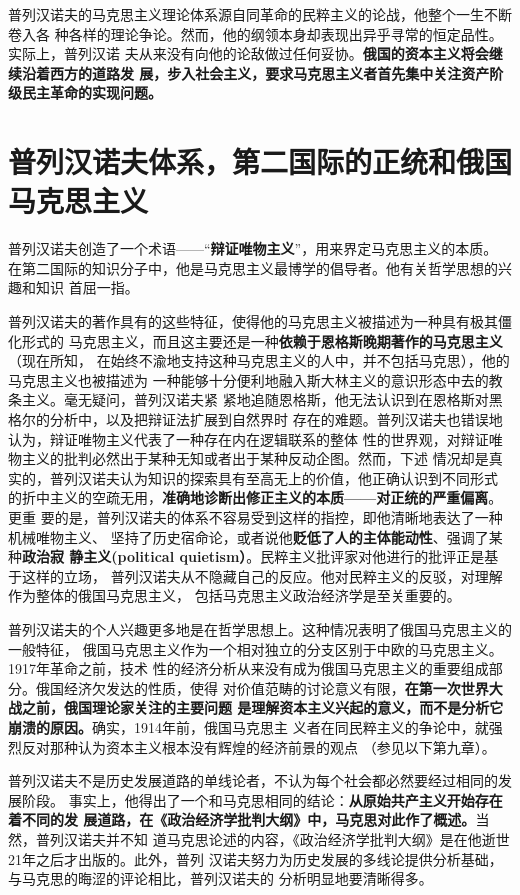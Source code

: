 普列汉诺夫的马克思主义理论体系源自同革命的民粹主义的论战，他整个一生不断卷入各
种各样的理论争论。然而，他的纲领本身却表现出异乎寻常的恒定品性。实际上，普列汉诺
夫从来没有向他的论敌做过任何妥协。\textbf{俄国的资本主义将会继续沿着西方的道路发
  展，步入社会主义，要求马克思主义者首先集中关注资产阶级民主革命的实现问题。}

\section{普列汉诺夫体系，第二国际的正统和俄国马克思主义}
普列汉诺夫创造了一个术语——“\textbf{辩证唯物主义}”，用来界定马克思主义的本质。
在第二国际的知识分子中，他是马克思主义最博学的倡导者。他有关哲学思想的兴趣和知识
首屈一指。

普列汉诺夫的著作具有的这些特征，使得他的马克思主义被描述为一种具有极其僵化形式的
马克思主义，而且这主要还是一种\textbf{依赖于恩格斯晚期著作的马克思主义}（现在所知，
在始终不渝地支持这种马克思主义的人中，并不包括马克思），他的马克思主义也被描述为
一种能够十分便利地融入斯大林主义的意识形态中去的教条主义。毫无疑问，普列汉诺夫紧
紧地追随恩格斯，他无法认识到在恩格斯对黑格尔的分析中，以及把辩证法扩展到自然界时
存在的难题。普列汉诺夫也错误地认为，辩证唯物主义代表了一种存在内在逻辑联系的整体
性的世界观，对辩证唯物主义的批判必然出于某种无知或者出于某种反动企图。然而，下述
情况却是真实的，普列汉诺夫认为知识的探索具有至高无上的价值，他正确认识到不同形式
的折中主义的空疏无用，\textbf{准确地诊断出修正主义的本质——对正统的严重偏离}。更重
要的是，普列汉诺夫的体系不容易受到这样的指控，即他清晰地表达了一种机械唯物主义、
坚持了历史宿命论，或者说他\textbf{贬低了人的主体能动性}、强调了某种\textbf{政治寂
  静主义(political quietism）}。民粹主义批评家对他进行的批评正是基于这样的立场，
普列汉诺夫从不隐藏自己的反应。他对民粹主义的反驳，对理解作为整体的俄国马克思主义，
包括马克思主义政治经济学是至关重要的。

普列汉诺夫的个人兴趣更多地是在哲学思想上。这种情况表明了俄国马克思主义的一般特征，
俄国马克思主义作为一个相对独立的分支区别于中欧的马克思主义。1917年革命之前，技术
性的经济分析从来没有成为俄国马克思主义的重要组成部分。俄国经济欠发达的性质，使得
对价值范畴的讨论意义有限，\textbf{在第一次世界大战之前，俄国理论家关注的主要问题
  是理解资本主义兴起的意义，而不是分析它崩溃的原因。}确实，1914年前，俄国马克思主
义者在同民粹主义的争论中，就强烈反对那种认为资本主义根本没有辉煌的经济前景的观点
（参见以下第九章）。

普列汉诺夫不是历史发展道路的单线论者，不认为每个社会都必然要经过相同的发展阶段。
事实上，他得出了一个和马克思相同的结论：\textbf{从原始共产主义开始存在着不同的发
  展道路，在《政治经济学批判大纲》中，马克思对此作了概述。}当然，普列汉诺夫并不知
道马克思论述的内容，《政治经济学批判大纲》是在他逝世21年之后才出版的。此外，普列
汉诺夫努力为历史发展的多线论提供分析基础，与马克思的晦涩的评论相比，普列汉诺夫的
分析明显地要清晰得多。

